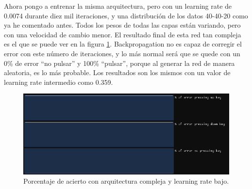 Ahora pongo a entrenar la misma arquitectura, pero con un learning rate de 0.0074 durante diez mil iteraciones, y una distribución de los datos 40-40-20 como ya he comentado antes. Todos los pesos  de todas las capas están variando, pero con una velocidad de cambio menor. El resultado final de esta red tan compleja es el que se puede ver en la figura \ref{bajo learning rate arquitectura compleja}. Backpropagation no es capaz de corregir el error con este número de iteraciones, y lo más normal será que se quede con un 0\% de error ``no pulsar'' y 100\% ``pulsar'', porque al generar la red de manera aleatoria, es lo más probable. Los resultados son los mismos con un valor de learning rate intermedio como 0.359.
\begin{figure}[H]
	\centering
	\includegraphics[width=15cm]{archivos/imagenes/arquitectura-compleja-learning-rate-bajo.png}
	\caption{Porcentaje de acierto con arquitectura compleja y learning rate bajo.}
	\label{bajo learning rate arquitectura compleja}
\end{figure}